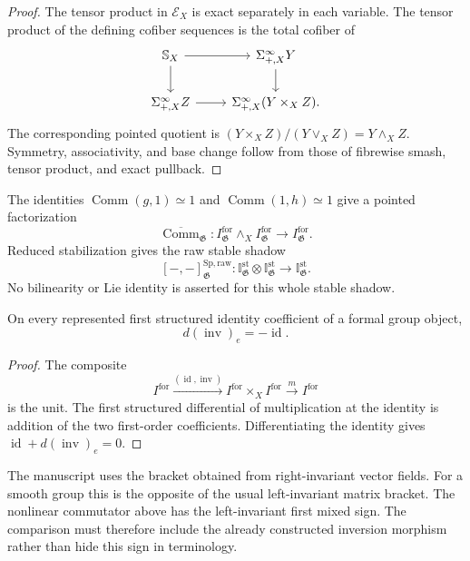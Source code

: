 \begin{proof}
The tensor product in $\mathcal E_X$ is exact separately in each variable.
The tensor product of the defining cofiber sequences is the total cofiber of
\[
\begin{tikzcd}
\mathbb S_X \arrow[r] \arrow[d] &
\Sigma^\infty_{+,X}Y \arrow[d]\\
\Sigma^\infty_{+,X}Z \arrow[r] &
\Sigma^\infty_{+,X}(Y\times_XZ).
\end{tikzcd}
\]
The corresponding pointed quotient is
$(Y\times_XZ)/(Y\vee_XZ)=Y\wedge_XZ$.  Symmetry, associativity, and base
change follow from those of fibrewise smash, tensor product, and exact
pullback.
\end{proof}

\begin{construction}
\label{con:as-binary-commutator-linearization}
The identities
$\operatorname{Comm}(g,1)\simeq1$ and
$\operatorname{Comm}(1,h)\simeq1$ give a pointed factorization
\[
    \overline{\operatorname{Comm}}_{\mathfrak G}:
    I_{\mathfrak G}^{\mathrm{for}}
    \wedge_X
    I_{\mathfrak G}^{\mathrm{for}}
    \longrightarrow
    I_{\mathfrak G}^{\mathrm{for}}.
\]
Reduced stabilization gives the raw stable shadow
\[
\boxed{
    [-,-]_{\mathfrak G}^{\mathrm{Sp,raw}}:
    \mathbb I_{\mathfrak G}^{\mathrm{st}}
    \otimes
    \mathbb I_{\mathfrak G}^{\mathrm{st}}
    \longrightarrow
    \mathbb I_{\mathfrak G}^{\mathrm{st}}.
}
\]
No bilinearity or Lie identity is asserted for this whole stable shadow.
\end{construction}

\begin{lemma}
\label{lem:as-inversion-first-differential}
On every represented first structured identity coefficient of a formal group
object,
\[
\boxed{
    d(\operatorname{inv})_e=-\operatorname{id}.
}
\]
\end{lemma}

\begin{proof}
The composite
\[
    I^{\mathrm{for}}
    \xrightarrow{(\operatorname{id},\operatorname{inv})}
    I^{\mathrm{for}}\times_XI^{\mathrm{for}}
    \xrightarrow{m}
    I^{\mathrm{for}}
\]
is the unit.  The first structured differential of multiplication at the
identity is addition of the two first-order coefficients.  Differentiating
the identity gives
$\operatorname{id}+d(\operatorname{inv})_e=0$.
\end{proof}

The manuscript uses the bracket obtained from right-invariant vector fields.
For a smooth group this is the opposite of the usual left-invariant matrix
bracket.  The nonlinear commutator above has the left-invariant first mixed
sign.  The comparison must therefore include the already constructed
inversion morphism rather than hide this sign in terminology.

